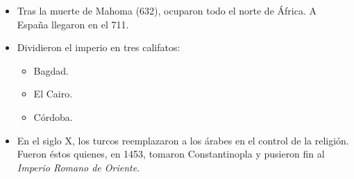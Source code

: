 \begin{itemize}
\item Tras la muerte de Mahoma (632), ocuparon todo el norte de África.
A España llegaron en el 711.

\item Dividieron el imperio en tres califatos:
\begin{itemize}
	\item Bagdad.
	\item El Cairo.
	\item Córdoba.
\end{itemize}

\item En el siglo X, los turcos reemplazaron a los árabes en el control de la religión.
Fueron éstos quienes, en 1453, tomaron Constantinopla y pusieron fin al \emph{Imperio Romano de Oriente}.

\end{itemize}